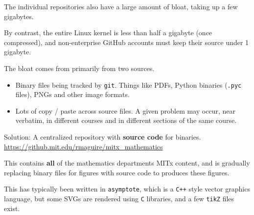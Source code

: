 \documentclass{beamer}
\begin{document}
    \begin{frame}
        The individual repositories also have a large amount of
        bloat, taking up a few gigabytes.
        \par\hfill\par
        By contrast, the entire Linux kernel
        is less than half a gigabyte (once compressed), and non-enterprise
        GitHub accounts must keep their source under 1 gigabyte.
    \end{frame}
    \begin{frame}
        The bloat comes from primarily from two sources.
        \begin{itemize}
            \item
                Binary files being tracked by \texttt{git}.
                Things like PDFs, Python binaries (\texttt{.pyc} files),
                PNGs and other image formats.
            \item
                Lots of copy / paste across source files. A given problem
                may occur, near verbatim, in different courses and
                in different sections of the same course.
        \end{itemize}
    \end{frame}
    \begin{frame}
        Solution: A centralized repository with \textbf{source code} for
        binaries.
        \url{https://github.mit.edu/rmaguire/mitx_mathematics}
        \par\hfill\par
        This contains \textbf{all} of the mathematics departments MITx
        content, and is gradually replacing binary files for figures with
        source code to produces these figures.
        \par\hfill\par
        This has typically been written
        in \texttt{asymptote}, which is a \texttt{C++} style vector graphics
        language, but some SVGs are rendered using \texttt{C} libraries, and
        a few \texttt{tikZ} files exist.
    \end{frame}
\end{document}
